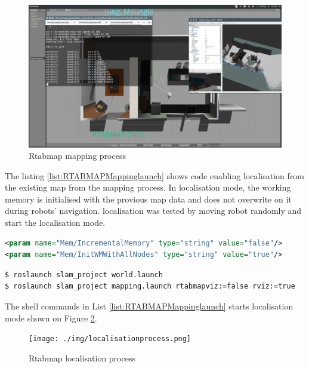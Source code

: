 \documentclass[10pt,journal,compsoc]{IEEEtran}
\begin{document}
\begin{figure}[thpb]
      \centering
      \includegraphics[width=\columnwidth]{./img/rtabmapmappingprocess.png}
      \caption{Rtabmap mapping process}
      \label{fig:rtabmapmappingprocess}
\end{figure}

The listing \ref{list:RTABMAPMappinglaunch} shows code enabling localisation from the existing map from the mapping process.
In localisation mode, the working memory is initialised with the provious map data and does not overwrite on it during robots' navigation. localisation was tested by moving robot randomly and start the localisation mode.

\begin{lstlisting}[language=XML, caption={Diff RTABMAP localisation.launch},label={list:RTABMAPLaunchDiff}]
<param name="Mem/IncrementalMemory" type="string" value="false"/>
<param name="Mem/InitWMWithAllNodes" type="string" value="true"/>
\end{lstlisting}

\begin{lstlisting}[language=sh, caption={RTABMAP localisation launch command},label={list:RTABMAPlocalisationlaunch}]
$ roslaunch slam_project world.launch
$ roslaunch slam_project mapping.launch rtabmapviz:=false rviz:=true
\end{lstlisting}

The shell commands in List \ref{list:RTABMAPMappinglaunch} starts localisation mode shown on Figure \ref{fig:localisationprocess}.
\begin{figure}[thpb]
      \centering
      \texttt{[image: ./img/localisationprocess.png]}
      \caption{Rtabmap localisation process}
      \label{fig:localisationprocess}
\end{figure}
\end{document}
